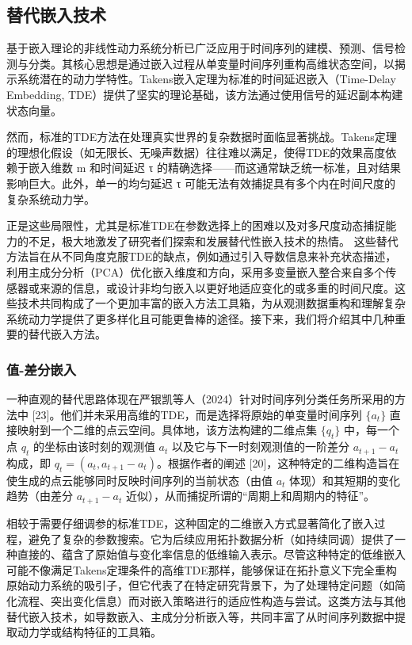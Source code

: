 \subsection{替代嵌入技术}
基于嵌入理论的非线性动力系统分析已广泛应用于时间序列的建模、预测、信号检测与分类。其核心思想是通过嵌入过程从单变量时间序列重构高维状态空间，以揭示系统潜在的动力学特性。Takens嵌入定理为标准的时间延迟嵌入（Time-Delay Embedding, TDE）提供了坚实的理论基础，该方法通过使用信号的延迟副本构建状态向量。

然而，标准的TDE方法在处理真实世界的复杂数据时面临显著挑战。Takens定理的理想化假设（如无限长、无噪声数据）往往难以满足，使得TDE的效果高度依赖于嵌入维数 m 和时间延迟 τ 的精确选择——而这通常缺乏统一标准，且对结果影响巨大。此外，单一的均匀延迟 τ 可能无法有效捕捉具有多个内在时间尺度的复杂系统动力学。

正是这些局限性，尤其是标准TDE在参数选择上的困难以及对多尺度动态捕捉能力的不足，极大地激发了研究者们探索和发展替代性嵌入技术的热情。 这些替代方法旨在从不同角度克服TDE的缺点，例如通过引入导数信息来补充状态描述，利用主成分分析（PCA）优化嵌入维度和方向，采用多变量嵌入整合来自多个传感器或来源的信息，或设计非均匀嵌入以更好地适应变化的或多重的时间尺度。这些技术共同构成了一个更加丰富的嵌入方法工具箱，为从观测数据重构和理解复杂系统动力学提供了更多样化且可能更鲁棒的途径。接下来，我们将介绍其中几种重要的替代嵌入方法。
\subsubsection{值-差分嵌入}
一种直观的替代思路体现在严银凯等人（2024）针对时间序列分类任务所采用的方法中 [23]。他们并未采用高维的TDE，而是选择将原始的单变量时间序列 $\{a_t\}$ 直接映射到一个二维的点云空间。具体地，该方法构建的二维点集 $\{q_t\}$ 中，每一个点 $q_t$ 的坐标由该时刻的观测值 $a_t$ 以及它与下一时刻观测值的一阶差分 $a_{t+1}-a_t$ 构成，即 $q_t = (a_t, a_{t+1}-a_t)$。根据作者的阐述 [20]，这种特定的二维构造旨在使生成的点云能够同时反映时间序列的当前状态（由值 $a_t$ 体现）和其短期的变化趋势（由差分 $a_{t+1}-a_t$ 近似），从而捕捉所谓的“周期上和周期内的特征”。

相较于需要仔细调参的标准TDE，这种固定的二维嵌入方式显著简化了嵌入过程，避免了复杂的参数搜索。它为后续应用拓扑数据分析（如持续同调）提供了一种直接的、蕴含了原始值与变化率信息的低维输入表示。尽管这种特定的低维嵌入可能不像满足Takens定理条件的高维TDE那样，能够保证在拓扑意义下完全重构原始动力系统的吸引子，但它代表了在特定研究背景下，为了处理特定问题（如简化流程、突出变化信息）而对嵌入策略进行的适应性构造与尝试。这类方法与其他替代嵌入技术，如导数嵌入、主成分分析嵌入等，共同丰富了从时间序列数据中提取动力学或结构特征的工具箱。

